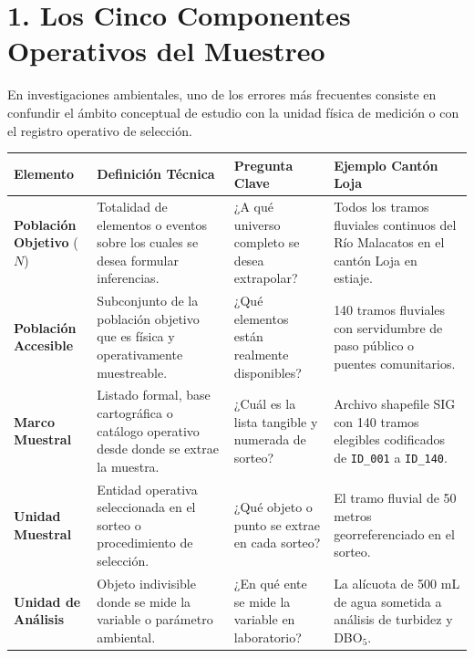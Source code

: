 \documentclass[11pt,a4paper]{article}
\begin{document}
\section*{1. Los Cinco Componentes Operativos del Muestreo}

En investigaciones ambientales, uno de los errores más frecuentes consiste en confundir el ámbito conceptual de estudio con la unidad física de medición o con el registro operativo de selección.

\begin{table}[h!]
\centering
\small
\begin{tabularx}{\linewidth}{p{3.2cm}p{4.2cm}p{4.2cm}Y}
\toprule
\textbf{Elemento} & \textbf{Definición Técnica} & \textbf{Pregunta Clave} & \textbf{Ejemplo Cantón Loja} \\
\midrule
\textbf{Población Objetivo} ($N$) & Totalidad de elementos o eventos sobre los cuales se desea formular inferencias. & ¿A qué universo completo se desea extrapolar? & Todos los tramos fluviales continuos del Río Malacatos en el cantón Loja en estiaje. \\
\midrule
\textbf{Población Accesible} & Subconjunto de la población objetivo que es física y operativamente muestreable. & ¿Qué elementos están realmente disponibles? & 140 tramos fluviales con servidumbre de paso público o puentes comunitarios. \\
\midrule
\textbf{Marco Muestral} & Listado formal, base cartográfica o catálogo operativo desde donde se extrae la muestra. & ¿Cuál es la lista tangible y numerada de sorteo? & Archivo shapefile SIG con 140 tramos elegibles codificados de \texttt{ID\_001} a \texttt{ID\_140}. \\
\midrule
\textbf{Unidad Muestral} & Entidad operativa seleccionada en el sorteo o procedimiento de selección. & ¿Qué objeto o punto se extrae en cada sorteo? & El tramo fluvial de 50 metros georreferenciado en el sorteo. \\
\midrule
\textbf{Unidad de Análisis} & Objeto indivisible donde se mide la variable o parámetro ambiental. & ¿En qué ente se mide la variable en laboratorio? & La alícuota de 500 mL de agua sometida a análisis de turbidez y DBO$_5$. \\
\bottomrule
\end{tabularx}
\end{table}
\end{document}
